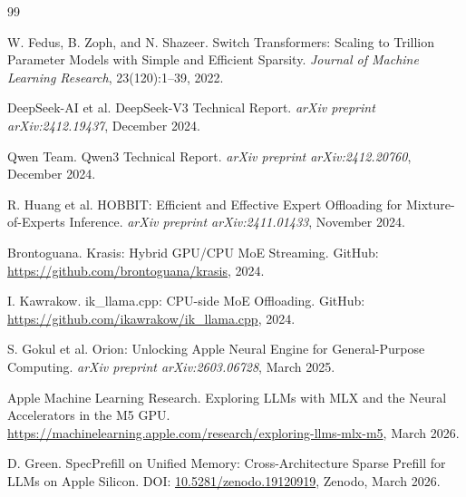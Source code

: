 \documentclass[11pt]{article}
\begin{document}
\begin{thebibliography}{99}

W. Fedus, B. Zoph, and N. Shazeer.
\newblock Switch Transformers: Scaling to Trillion Parameter Models with Simple and Efficient Sparsity.
\newblock \textit{Journal of Machine Learning Research}, 23(120):1--39, 2022.

DeepSeek-AI et al.
\newblock DeepSeek-V3 Technical Report.
\newblock \textit{arXiv preprint arXiv:2412.19437}, December 2024.

Qwen Team.
\newblock Qwen3 Technical Report.
\newblock \textit{arXiv preprint arXiv:2412.20760}, December 2024.

R. Huang et al.
\newblock HOBBIT: Efficient and Effective Expert Offloading for Mixture-of-Experts Inference.
\newblock \textit{arXiv preprint arXiv:2411.01433}, November 2024.

Brontoguana.
\newblock Krasis: Hybrid GPU/CPU MoE Streaming.
\newblock GitHub: \url{https://github.com/brontoguana/krasis}, 2024.

I. Kawrakow.
\newblock ik\_llama.cpp: CPU-side MoE Offloading.
\newblock GitHub: \url{https://github.com/ikawrakow/ik_llama.cpp}, 2024.

S. Gokul et al.
\newblock Orion: Unlocking Apple Neural Engine for General-Purpose Computing.
\newblock \textit{arXiv preprint arXiv:2603.06728}, March 2025.

Apple Machine Learning Research.
\newblock Exploring LLMs with MLX and the Neural Accelerators in the M5 GPU.
\newblock \url{https://machinelearning.apple.com/research/exploring-llms-mlx-m5}, March 2026.

D. Green.
\newblock SpecPrefill on Unified Memory: Cross-Architecture Sparse Prefill for LLMs on Apple Silicon.
\newblock DOI: \href{https://doi.org/10.5281/zenodo.19120919}{10.5281/zenodo.19120919}, Zenodo, March 2026.

\end{thebibliography}
\end{document}
